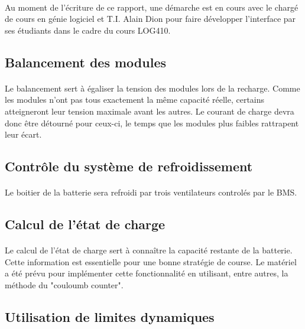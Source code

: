 		\paragraph{}
		Au moment de l'écriture de ce rapport, une démarche est en cours avec le chargé de cours en génie logiciel et T.I. Alain Dion pour faire développer l'interface par ses étudiants dans le cadre du cours LOG410.

	\subsection{Balancement des modules}

		\paragraph{}
		Le balancement sert à égaliser la tension des modules lors de la recharge. Comme les modules n'ont pas tous exactement la même capacité réelle, certains atteigneront leur tension maximale avant les autres. Le courant de charge devra donc être détourné pour ceux-ci, le temps que les modules plus faibles rattrapent leur écart.

	\subsection{Contrôle du système de refroidissement}

		\paragraph{}
		Le boitier de la batterie sera refroidi par trois ventilateurs controlés par le BMS.

	\subsection{Calcul de l’état de charge}

		\paragraph{}
		Le calcul de l'état de charge sert à connaître la capacité restante de la batterie. Cette information est essentielle pour une bonne stratégie de course. Le matériel a été prévu pour implémenter cette fonctionnalité en utilisant, entre autres, la méthode du "couloumb counter".

	\subsection{Utilisation de limites dynamiques}

